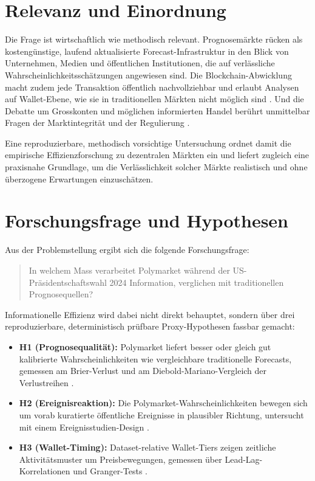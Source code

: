 \section{Relevanz und Einordnung}
Die Frage ist wirtschaftlich wie methodisch relevant. Prognosemärkte rücken als
kostengünstige, laufend aktualisierte Forecast-Infrastruktur in den Blick von
Unternehmen, Medien und öffentlichen Institutionen, die auf verlässliche
Wahrscheinlichkeitsschätzungen angewiesen sind. Die Blockchain-Abwicklung macht
zudem jede Transaktion öffentlich nachvollziehbar und erlaubt Analysen auf
Wallet-Ebene, wie sie in traditionellen Märkten nicht möglich sind
\citep{zotero_poly_001}. Und die Debatte um Grosskonten und möglichen informierten
Handel berührt unmittelbar Fragen der Marktintegrität und der Regulierung
\citep{zotero_poly_005,zotero_poly_007}.

Eine reproduzierbare, methodisch vorsichtige Untersuchung ordnet damit die
empirische Effizienzforschung zu dezentralen Märkten ein und liefert zugleich eine
praxisnahe Grundlage, um die Verlässlichkeit solcher Märkte realistisch und ohne
überzogene Erwartungen einzuschätzen.

\section{Forschungsfrage und Hypothesen}
Aus der Problemstellung ergibt sich die folgende Forschungsfrage:

\begin{quote}
In welchem Mass verarbeitet Polymarket während der US-Präsidentschaftswahl 2024
Information, verglichen mit traditionellen Prognosequellen?
\end{quote}

Informationelle Effizienz \citep{lit_emh_001} wird dabei nicht direkt behauptet,
sondern über drei reproduzierbare, deterministisch prüfbare Proxy-Hypothesen
fassbar gemacht:

\begin{itemize}
  \item \textbf{H1 (Prognosequalität):} Polymarket liefert besser oder gleich gut
  kalibrierte Wahrscheinlichkeiten wie vergleichbare traditionelle Forecasts,
  gemessen am Brier-Verlust \citep{lit_brier_001} und am
  Diebold-Mariano-Vergleich der Verlustreihen \citep{lit_dm_001}.
  \item \textbf{H2 (Ereignisreaktion):} Die Polymarket-Wahrscheinlichkeiten bewegen
  sich um vorab kuratierte öffentliche Ereignisse in plausibler Richtung,
  untersucht mit einem Ereignisstudien-Design \citep{lit_eventstudy_001}.
  \item \textbf{H3 (Wallet-Timing):} Dataset-relative Wallet-Tiers zeigen zeitliche
  Aktivitätsmuster um Preisbewegungen, gemessen über Lead-Lag-Korrelationen und
  Granger-Tests \citep{lit_granger_001}.
\end{itemize}

